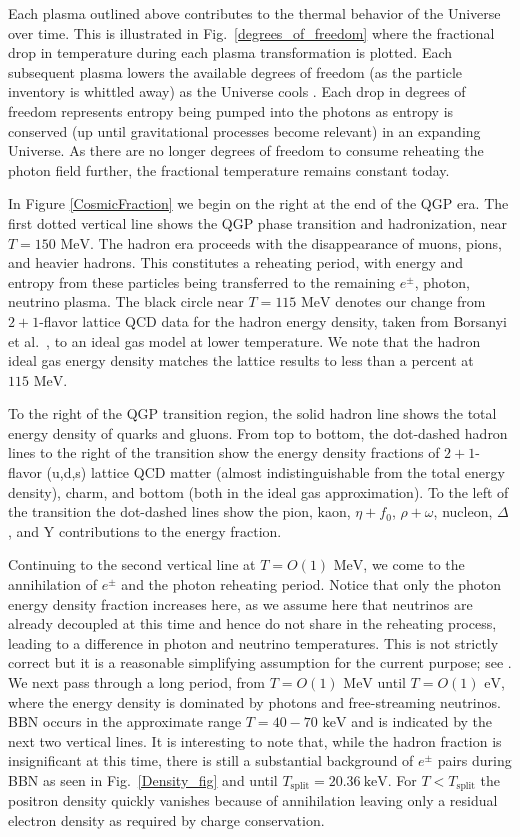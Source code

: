 \documentclass[universe,article,submit,moreauthors,pdftex,a4paper]{Definitions/mdpi}
\newcommand{\MeV}{\text{ MeV}}
\newcommand{\keV}{\text{ keV}}
\newcommand{\eV}{\text{ eV}}
\newcommand*{\rf}[1]{Fig.~{\ref{#1}}}
\begin{document}
Each plasma outlined above contributes to the thermal behavior of the Universe over time. This is illustrated in \rf{degrees_of_freedom} where the fractional drop in temperature during each plasma transformation is plotted. Each subsequent plasma lowers the available degrees of freedom (as the particle inventory is whittled away) as the Universe cools \cite{Rafelski:2013yka}. Each drop in degrees of freedom represents entropy being pumped into the photons as entropy is conserved (up until gravitational processes become relevant) in an expanding Universe. As there are no longer degrees of freedom to consume reheating the photon field further, the fractional temperature remains constant today.

In Figure \ref{CosmicFraction} we begin on the right at the end  of the QGP era.  The first dotted vertical line shows the QGP phase transition and hadronization, near $T=150\MeV$. The hadron era proceeds with the disappearance of muons, pions, and heavier hadrons.  This constitutes a reheating period, with energy and entropy from these particles being transferred to the remaining $e^\pm$, photon, neutrino plasma.   The black circle near $T=115\MeV$ denotes our change from $2+1$-flavor lattice QCD data for the hadron energy density, taken from Borsanyi et al.~\cite{Borsanyi:2013bia}, to an ideal gas model at lower temperature.  We note that the hadron ideal gas energy density matches the lattice results to less than a percent at $115\MeV$. 

To the right of the QGP transition region, the solid hadron line shows the total energy density of quarks and gluons. From top to bottom, the dot-dashed hadron lines to the right of the transition show the energy density fractions of $2+1$-flavor (u,d,s) lattice QCD matter (almost indistinguishable from the total energy density), charm, and bottom (both in the ideal gas approximation).  To the left of the transition the dot-dashed lines show the  pion, kaon, $\eta+f_0$, $\rho+\omega$, nucleon,  $\Delta$, and Y contributions to the energy fraction.


Continuing to the second vertical line at $T=O(1)\MeV$, we come to the annihilation  of $e^\pm$ and the photon reheating period.  Notice that only the photon energy density fraction increases here, as we assume here that neutrinos are already decoupled at this time and hence do not share in the reheating process, leading to a difference in photon and neutrino temperatures. This is not strictly correct but it is a reasonable simplifying assumption for the current purpose; see \cite{Mangano:2005cc,Fornengo:1997wa,Mangano:2001iu,Birrell:2012gg}.  We next pass through a long period, from $T=O(1)\MeV$ until $T=O(1)\eV$, where the energy density is dominated by photons and free-streaming neutrinos.  BBN occurs in the approximate range $T=40-70\keV$ and is indicated by the next two vertical lines.  It is interesting to note that, while the hadron fraction is insignificant at this time, there is still a substantial background of $e^\pm$ pairs during BBN as seen in \rf{Density_fig} and until $T_{\mathrm{split}} = 20.36\ \mathrm{keV}$. For $T<T_{\mathrm{split}}$ the positron density quickly vanishes because of annihilation leaving only a residual electron density as required by charge conservation. 
\end{document}
